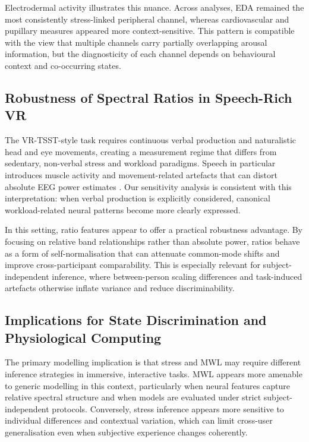 \documentclass[lettersize,journal]{IEEEtran}
\begin{document}
Electrodermal activity illustrates this nuance. Across analyses, EDA remained the most consistently stress-linked peripheral channel, whereas cardiovascular and pupillary measures appeared more context-sensitive. This pattern is compatible with the view that multiple channels carry partially overlapping arousal information, but the diagnosticity of each channel depends on behavioural context and co-occurring states.

\subsection{Robustness of Spectral Ratios in Speech-Rich VR}
The VR-TSST-style task requires continuous verbal production and naturalistic head and eye movements, creating a measurement regime that differs from sedentary, non-verbal stress and workload paradigms. Speech in particular introduces muscle activity and movement-related artefacts that can distort absolute EEG power estimates \cite{goncharova_emg_2003, goncharovaEMGContaminationEEG2003}. Our sensitivity analysis is consistent with this interpretation: when verbal production is explicitly considered, canonical workload-related neural patterns become more clearly expressed.

In this setting, ratio features appear to offer a practical robustness advantage. By focusing on relative band relationships rather than absolute power, ratios behave as a form of self-normalisation that can attenuate common-mode shifts and improve cross-participant comparability. This is especially relevant for subject-independent inference, where between-person scaling differences and task-induced artefacts otherwise inflate variance and reduce discriminability.

\subsection{Implications for State Discrimination and Physiological Computing}
The primary modelling implication is that stress and MWL may require different inference strategies in immersive, interactive tasks. MWL appears more amenable to generic modelling in this context, particularly when neural features capture relative spectral structure and when models are evaluated under strict subject-independent protocols. Conversely, stress inference appears more sensitive to individual differences and contextual variation, which can limit cross-user generalisation even when subjective experience changes coherently.
\end{document}
